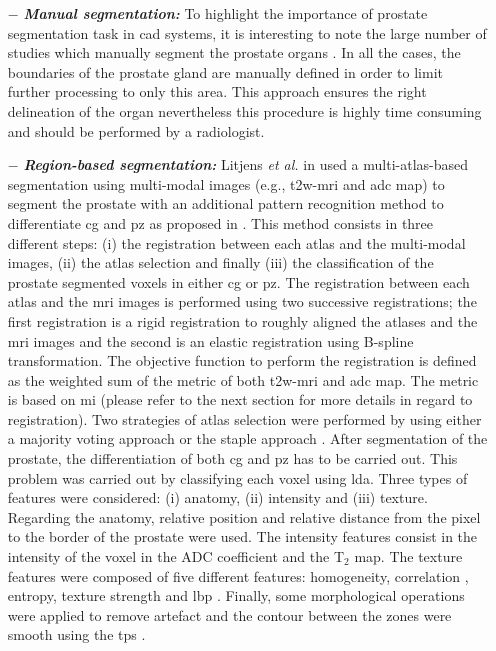 \begin{enumerate}[leftmargin=*]

\item[$-$] \textbf{\textit{Manual segmentation:}} To highlight the importance of prostate segmentation task in \ac{cad} systems, it is interesting to note the large number of studies which manually segment the prostate organs \cite{Artan2009,Artan2010,Matulewicz2013,Niaf2011,Niaf2012,Ozer2009,Ozer2010,Puech2009,Vos2008,Vos2008a}.
In all the cases, the boundaries of the prostate gland are manually defined in order to limit further processing to only this area.
This approach ensures the right delineation of the organ nevertheless this procedure is highly time consuming and should be performed by a radiologist.

\item[$-$] \textbf{\textit{Region-based segmentation:}} Litjens \textit{et al.} in \cite{Litjens2012} used a multi-atlas-based segmentation using multi-modal images (e.g., \ac{t2w}-\ac{mri} and \ac{adc} map) to segment the prostate with an additional pattern recognition method to differentiate \ac{cg} and \ac{pz} as proposed in \cite{Litjens2012a}.
This method consists in three different steps: (i) the registration between each atlas and the multi-modal images, (ii) the atlas selection and finally (iii) the classification of the prostate segmented voxels in either \ac{cg} or \ac{pz}. 
The registration between each atlas and the \ac{mri} images is performed using two successive registrations; the first registration is a rigid registration to roughly aligned the atlases and the \ac{mri} images and the second is an elastic registration using B-spline transformation.
The objective function to perform the registration is defined as the weighted sum of the metric of both \ac{t2w}-\ac{mri} and \ac{adc} map.
The metric is based on \ac{mi} (please refer to the next section for more details in regard to registration).
Two strategies of atlas selection were performed by using either a majority voting approach or the \ac{staple} approach \cite{Warfield2004}.
After segmentation of the prostate, the differentiation of both \ac{cg} and \ac{pz} has to be carried out.
This problem was carried out by classifying each voxel using \ac{lda}.
Three types of features were considered: (i) anatomy, (ii) intensity and (iii) texture.
Regarding the anatomy, relative position and relative distance from the pixel to the border of the prostate were used.
The intensity features consist in the intensity of the voxel in the ADC coefficient and the T$_2$ map.
The texture features were composed of five different features: homogeneity, correlation \cite{Amadasun1989}, entropy, texture strength \cite{Li2005a} and \ac{lbp} \cite{Ojala1996}.
Finally, some morphological operations were applied to remove artefact and the contour between the zones were smooth using the \ac{tps} \cite{Bookstein1989}.


\end{enumerate}
